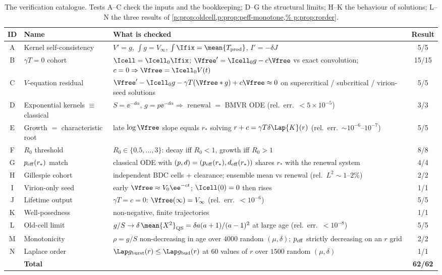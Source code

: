 \begin{table}[htbp]
\centering
\renewcommand{\arraystretch}{1.1}
\small
\begin{tabular}{@{}clp{}c@{}}
\toprule
ID & Name & What is checked & Result \\
\midrule
A & Kernel self-consistency &
  $V'=g$, $\int g=V_\infty$, $\int\Ifix=\mean{T_{\rm prod}}$, $I'=-\delta J$ &
  5/5 \\
B & $\gamma T=0$ cohort &
  $\Icell=\Icell_0\Ifix$; $\Vfree'=\Icell_0 g-c\Vfree$ vs exact
  convolution; $c=0\Rightarrow\Vfree=\Icell_0 V(t)$ &
  15/15 \\
C & $V$-equation residual &
  $\Vfree'-\Icell_0 g-\gamma T(\Vfree*g)+c\Vfree\approx0$ on
  supercritical / subcritical / virion-seed solutions &
  5/5 \\
D & Exponential kernels $\equiv$ classical &
  $S=\ee^{-d\alpha}$, $g=p\ee^{-d\alpha}\Rightarrow$ renewal $=$ BMVR ODE
  (rel.\ err.\ $<5\times10^{-5}$) &
  3/3 \\
E & Growth $=$ characteristic root &
  late $\log\Vfree$ slope equals $r_*$ solving $r+c=\gamma T\delta\Lap{K}(r)$
  (rel.\ err.\ $\sim10^{-6}$--$10^{-7}$) &
  5/5 \\
F & $R_0$ threshold &
  $R_0\in\{0.5,\ldots,3\}$: decay iff $R_0<1$, growth iff $R_0>1$ &
  8/8 \\
G & $p_{\rm eff}(r_*)$ match &
  classical ODE with $(p,d)=(p_{\rm eff}(r_*),d_{\rm eff}(r_*))$ shares
  $r_*$ with the renewal system &
  4/4 \\
H & Gillespie cohort &
  independent BDC cells $+$ clearance; ensemble mean vs renewal
  (rel.\ $L^2\sim1$--$2\%$) &
  2/2 \\
I & Virion-only seed &
  early $\Vfree\approx V_0\ee^{-ct}$; $\Icell(0)=0$ then rises &
  1/1 \\
J & Lifetime output &
  $\gamma T=c=0$: $\Vfree(\infty)=V_\infty$ (rel.\ err.\ $<10^{-6}$) &
  5/5 \\
K & Well-posedness &
  non-negative, finite trajectories &
  1/1 \\
L & Old-cell limit &
  $g/S\to\delta\,\mean{X^2}_{\rm QS}=\delta a(a+1)/(a-1)^2$ at large age
  (rel.\ err.\ $<10^{-8}$) &
  5/5 \\
M & Monotonicity &
  $\rho=g/S$ non-decreasing in age over $4000$ random $(\mu,\delta)$;
  $p_{\rm eff}$ strictly decreasing on an $r$ grid &
  2/2 \\
N & Laplace order &
  $\Lap g_{\rm burst}(r)\le\Lap g_{\rm bud}(r)$ at $60$ values of $r$ over
  $1500$ random $(\mu,\delta)$ &
  1/1 \\
\midrule
 & \textbf{Total} & & \textbf{62/62} \\
\bottomrule
\end{tabular}
\caption{The verification catalogue. Tests A--C check the inputs and the
bookkeeping; D--G the structural limits; H--K the behaviour of solutions;
L--N the three results of \cref{p:prop:oldcell,p:prop:peff-monotone,%
p:prop:rorder}.}
\label{p:tab:verification}
\end{table}

